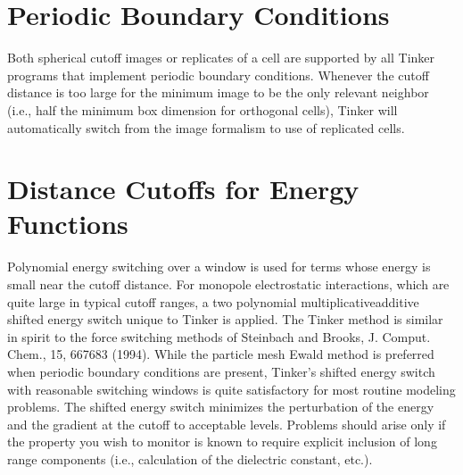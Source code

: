 \documentclass[letterpaper,11pt,english]{sphinxmanual}
\begin{document}
\section{Periodic Boundary Conditions}
\label{\detokenize{text/special-features:periodic-boundary-conditions}}
\sphinxAtStartPar
Both spherical cutoff images or replicates of a cell are supported by all Tinker programs that implement periodic boundary conditions. Whenever the cutoff distance is too large for the minimum image to be the only relevant neighbor (i.e., half the minimum box dimension for orthogonal cells), Tinker will automatically switch from the image formalism to use of replicated cells.


\section{Distance Cutoffs for Energy Functions}
\label{\detokenize{text/special-features:distance-cutoffs-for-energy-functions}}
\sphinxAtStartPar
Polynomial energy switching over a window is used for terms whose energy is small near the cutoff distance. For monopole electrostatic interactions, which are quite large in typical cutoff ranges, a two polynomial multiplicative\sphinxhyphen{}additive shifted energy switch unique to Tinker is applied. The Tinker method is similar in spirit to the force switching methods of Steinbach and Brooks, J. Comput. Chem., 15, 667\sphinxhyphen{}683 (1994). While the particle mesh Ewald method is preferred when periodic boundary conditions are present, Tinker’s shifted energy switch with reasonable switching windows is quite satisfactory for most routine modeling problems. The shifted energy switch minimizes the perturbation of the energy and the gradient at the cutoff to acceptable levels. Problems should arise only if the property you wish to monitor is known to require explicit inclusion of long range components (i.e., calculation of the dielectric constant, etc.).
\end{document}
